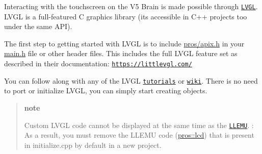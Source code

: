Interacting with the touchscreen on the V5 Brain is made possible through \href{https://littlevgl.com}{\tt L\+V\+GL}. L\+V\+GL is a full-\/featured C graphics library (it\textquotesingle{}s accessible in C++ projects too under the same A\+PI).

The first step to getting started with L\+V\+GL is to include {\ttfamily \hyperlink{apix_8h}{pros/apix.\+h}} in your {\ttfamily \hyperlink{main_8h}{main.\+h}} file or other header files. This includes the full L\+V\+GL feature set as described in their documentation\+: \href{https://littlevgl.com/}{\tt https\+://littlevgl.\+com/}

You can follow along with any of the L\+V\+GL \href{https://github.com/littlevgl/lv_examples/tree/master/lv_tutorial}{\tt tutorials} or \href{https://docs.littlevgl.com/#Objects}{\tt wiki}. There is no need to port or initialize L\+V\+GL, you can simply start creating objects.

\begin{quote}
{\bfseries note}

Custom L\+V\+GL code cannot be displayed at the same time as the \href{./llemu.html}{\tt L\+L\+E\+MU}. \+: As a result, you must remove the L\+L\+E\+MU code ({\ttfamily \hyperlink{namespacepros_1_1lcd}{pros\+::lcd}}) that is present in {\ttfamily initialize.\+cpp} by default in a new project. \end{quote}
